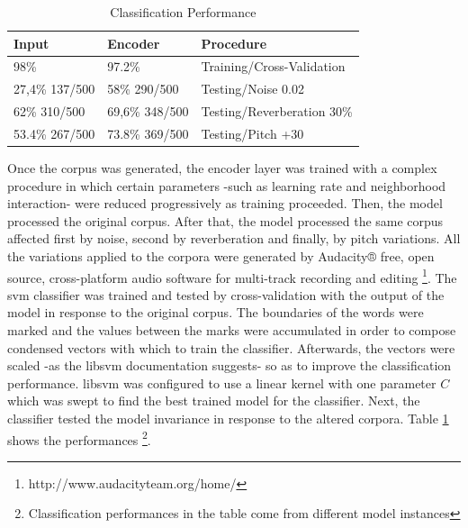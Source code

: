\documentclass[11pt,a4paper]{article}
\begin{document}
\begin{table}[]
\centering
\caption{Classification Performance}
\label{classification_performances}
\begin{tabular}{|l|l|l|}
\hline
Input          & Encoder        & Procedure                  \\ \hline
98\%           & 97.2\%         & Training/Cross-Validation  \\ \hline
27,4\% 137/500 & 58\% 290/500   & Testing/Noise 0.02         \\ \hline
62\% 310/500   & 69,6\% 348/500 & Testing/Reverberation 30\% \\ \hline
53.4\% 267/500 & 73.8\% 369/500 & Testing/Pitch +30          \\ \hline
\end{tabular}
\end{table}

Once the corpus was generated, the encoder layer was trained with a complex procedure
in which certain parameters -such as learning rate and neighborhood interaction- were
reduced progressively as training proceeded. 
Then, the model processed the original corpus.
After that, the model processed the same corpus affected first by noise,
second by reverberation and finally, by pitch variations.
All the variations applied to the corpora were generated by
Audacity® free, open source, cross-platform audio software for
multi-track recording and editing
\footnote{http://www.audacityteam.org/home/}.
The \gls{svm} classifier was trained and tested by cross-validation
with the output of the model in response to the original corpus.
The boundaries of the words were marked and the values between the marks
were accumulated in order to compose condensed vectors with which to train
the classifier.
Afterwards, the vectors were scaled -as the \gls{libsvm} documentation suggests-
so as to improve the classification performance.
\gls{libsvm} was configured to use a linear kernel with one parameter $C$ which
was swept to find the best trained model for the classifier.
Next, the classifier tested the model invariance
in response to the altered corpora.
Table \ref{classification_performances} shows the performances
\footnote{Classification performances in the table come from different model instances}. \\




\end{document}
